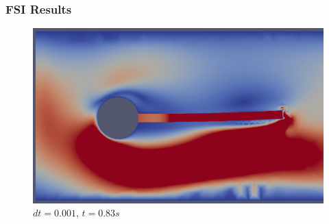 \documentclass{beamer}
\begin{document}
\begin{frame}
\frametitle{FSI Results}
\begin{figure}[h]
\centering
	\includegraphics[width=\textwidth]{t_830}
	\caption{ $dt = 0.001$, $t = 0.83s$}
	\label{fig:t_830}
\end{figure}
\end{frame}


%
\end{document}
